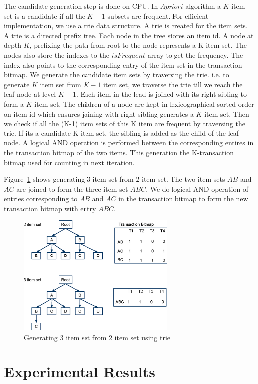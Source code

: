 \documentclass[conference]{IEEEtran}
\begin{document}
The candidate generation step is done on CPU. In $Apriori$ algorithm a $K$ item set is a candidate if all the $K-1$ subsets are frequent. For efficient implementation, we use a trie data structure. A trie is created for the item sets. A trie is a directed prefix tree. Each node in the tree stores an item id.
A node at depth $K$, prefixing the path from root to the node represents a K item set. The nodes also store the indexes to the $isFrequent$ array to get the frequency. The index also points to the corresponding entry of the item set in the transaction bitmap. We generate the candidate item sets by traversing the trie. i.e. to generate $K$ item set from $K - 1$ item set, we traverse the trie till we reach the leaf node at level $K - 1$. Each item in the lead is joined with its right sibling to form a $K$ item set. The children of a node are kept in lexicographical sorted order on item id which ensures joining with right sibling generates a $K$ item set. Then we check if all the (K-1) item sets of this K item are frequent by traversing the trie. If its a candidate K-item set, the sibling is added as the child of the leaf node. A logical AND operation is performed between the corresponding entires in the transaction bitmap of the two items. This generation the K-transaction bitmap used for counting in next iteration.

Figure~\ref{fig:trie} shows generating $3$ item set from $2$ item set. The two item sets $AB$ and $AC$ are joined to form the three item set $ABC$. We do  logical AND operation of entries corresponding to $AB$ and $AC$ in the transaction bitmap to form the new transaction bitmap with entry $ABC$.


\begin{figure}[!t]
\centering
\includegraphics[width=3in]{trie.eps}
\caption{Generating 3 item set from 2 item set using trie}
\label{fig:trie}
\end{figure}


\section{Experimental Results}
\end{document}
